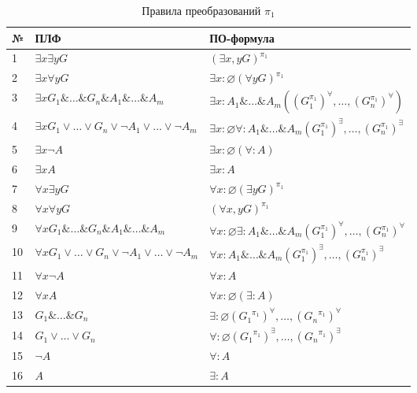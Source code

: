 \documentclass[a4paper]{jctart15b}
\begin{document}
\begin{table}[htbp]
	\caption{Правила преобразований $\pi_1$}\vspace*{2mm}

	\begin{tabular}{|l|l|l|}
		\hline
		\textbf{№} & \textbf{ПЛФ} & \textbf{ПО-формула} \\
		\hline
		1 & $\exists{x}\exists{y}G$ & $(\exists{x,y}G)^{\pi_1}$ \\
		\hline
		2 & $\exists{x}\forall{y}G$ & $\exists{x}\colon\varnothing(\forall{y}G)^{\pi_1}$ \\
		\hline
		3 & $\exists{x}G_1 \& \ldots \& G_n \& A_1 \& \ldots \& A_m $ & $\exists{x}\colon A_1 \& \ldots \& A_m ((G_{1}^{\pi_1})^{\forall},\ldots,(G_{n}^{\pi_1})^{\forall})$ \\
		\hline
		4 & $\exists{x}G_1 \vee \ldots \vee G_n \vee \neg A_1 \vee \ldots \vee \neg A_m$ & $\exists{x}\colon\varnothing \forall\colon A_1 \& \ldots \& A_m (G_{1}^{\pi_1})^{\exists},\ldots,(G_{n}^{\pi_1})^{\exists}$ \\
		\hline
		5 & $\exists{x}\neg A$ & $\exists{x}\colon\varnothing(\forall\colon A)$  \\
		\hline
		6 & $\exists{x}A$ & $\exists{x}\colon A$ \\
		\hline
		7 & $\forall{x}\exists{y}G$ & $\forall{x}\colon\varnothing(\exists{y}G)^{\pi_1}$ \\
		\hline
		8 & $\forall{x}\forall{y}G$ & $(\forall{x,y}G)^{\pi_1}$ \\
		\hline
		9 & $\forall{x}G_1 \& \ldots \& G_n \& A_1 \& \ldots \& A_m$ & $\forall{x}\colon\varnothing \exists\colon A_1 \& \ldots \& A_m (G_{1}^{\pi_1})^{\forall},\ldots,(G_{n}^{\pi_1})^{\forall}$ \\
		\hline
		10 & $\forall{x}G_1 \vee \ldots \vee G_n \vee \neg A_1 \vee \ldots \vee \neg A_m$ & $\forall{x}\colon A_1 \& \ldots \& A_m (G_{1}^{\pi_1})^{\exists},\ldots,(G_{n}^{\pi_1})^{\exists}$ \\
		\hline
		11 & $\forall{x}\neg A$ & $\forall{x}\colon A$ \\
		\hline
		12 & $\forall{x}A$ & $\forall{x}\colon\varnothing (\exists\colon A)$ \\
		\hline
		13 & $G_1 \&\ldots\& G_n$ & $\exists\colon\varnothing({G_1}^{\pi_1})^{\forall},\ldots,({G_n}^{\pi_1})^{\forall}$ \\
		\hline
		14 & $G_1 \vee\ldots\vee G_n$ & $\forall\colon\varnothing({G_1}^{\pi_1})^{\exists},\ldots,({G_n}^{\pi_1})^{\exists}$ \\
		\hline
		15 & $\neg A$ & $\forall \colon A$ \\
		\hline
		16 & $A$ & $\exists \colon A$ \\
		\hline
	\end{tabular}
\end{table}
\end{document}
